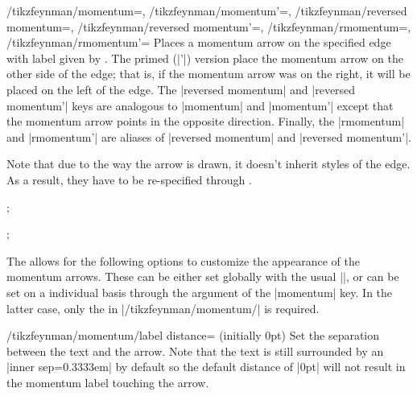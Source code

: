 \documentclass[a4paper,final]{ltxdoc}
\begin{document}
\begin{codeexample}[execute code=false]
\begin{keylist}{%
    /tikzfeynman/momentum=,
    /tikzfeynman/momentum'=,
    /tikzfeynman/reversed momentum=,
    /tikzfeynman/reversed momentum'=,
    /tikzfeynman/rmomentum=,
    /tikzfeynman/rmomentum'=}
  Places a momentum arrow on the specified edge with label given by .
  The primed (|'|) version place the momentum arrow on the other side of the
  edge; that is, if the momentum arrow was on the right, it will be placed on
  the left of the edge.  The |reversed momentum| and |reversed momentum'| keys
  are analogous to |momentum| and |momentum'| except that the momentum arrow
  points in the opposite direction.  Finally, the |rmomentum| and |rmomentum'|
  are aliases of |reversed momentum| and |reversed momentum'|.

  Note that due to the way the arrow is drawn, it doesn't inherit styles of the
  edge.  As a result, they have to be re-specified through .

\begin{codeexample}[]
;
\end{codeexample}

\begin{codeexample}[]
;
\end{codeexample}

The  allows for the following options to customize the appearance
of the momentum arrows.  These can be either set globally with the usual
|\tikzfeynmanset|, or can be set on a individual basis through the
 argument of the |momentum| key.  In the latter case, only the
 in |/tikzfeynman/momentum/| is required.

\begin{key}{/tikzfeynman/momentum/label distance= (initially 0pt)}
  Set the separation between the text and the arrow.  Note that the text is
  still surrounded by an |inner sep=0.3333em| by default so the default
  distance of |0pt| will not result in the momentum label touching the arrow.
\end{key}


\end{keylist}
\end{codeexample}
\end{document}
